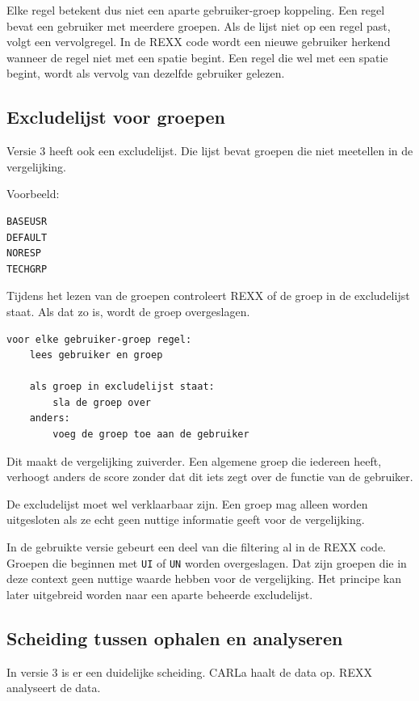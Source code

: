 Elke regel betekent dus niet een aparte gebruiker-groep koppeling. Een regel bevat een gebruiker met meerdere groepen. Als de lijst niet op een regel past, volgt een vervolgregel. In de REXX code wordt een nieuwe gebruiker herkend wanneer de regel niet met een spatie begint. Een regel die wel met een spatie begint, wordt als vervolg van dezelfde gebruiker gelezen.

\subsection*{Excludelijst voor groepen}

Versie 3 heeft ook een excludelijst. Die lijst bevat groepen die niet meetellen in de vergelijking.

Voorbeeld:

\begin{verbatim}
BASEUSR
DEFAULT
NORESP
TECHGRP
\end{verbatim}

Tijdens het lezen van de groepen controleert REXX of de groep in de excludelijst staat. Als dat zo is, wordt de groep overgeslagen.

\begin{verbatim}
voor elke gebruiker-groep regel:
    lees gebruiker en groep

    als groep in excludelijst staat:
        sla de groep over
    anders:
        voeg de groep toe aan de gebruiker
\end{verbatim}

Dit maakt de vergelijking zuiverder. Een algemene groep die iedereen heeft, verhoogt anders de score zonder dat dit iets zegt over de functie van de gebruiker.

De excludelijst moet wel verklaarbaar zijn. Een groep mag alleen worden uitgesloten als ze echt geen nuttige informatie geeft voor de vergelijking.

In de gebruikte versie gebeurt een deel van die filtering al in de REXX code. Groepen die beginnen met \texttt{UI} of \texttt{UN} worden overgeslagen. Dat zijn groepen die in deze context geen nuttige waarde hebben voor de vergelijking. Het principe kan later uitgebreid worden naar een aparte beheerde excludelijst.

\subsection*{Scheiding tussen ophalen en analyseren}

In versie 3 is er een duidelijke scheiding. CARLa haalt de data op. REXX analyseert de data.

